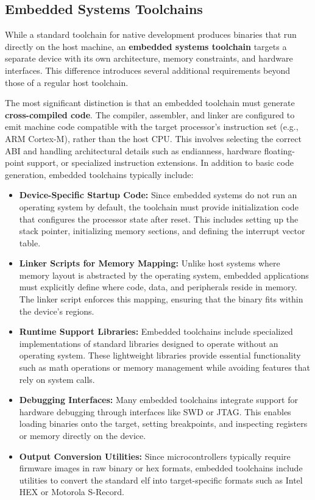 \subsection{Embedded Systems Toolchains}
While a standard toolchain for native development produces binaries that run directly on the host machine, an \textbf{embedded systems toolchain} targets a separate device with its own architecture, memory constraints, and hardware interfaces. 
This difference introduces several additional requirements beyond those of a regular host toolchain.

The most significant distinction is that an embedded toolchain must generate \textbf{cross-compiled code}. 
The compiler, assembler, and linker are configured to emit machine code compatible with the target processor's instruction set (e.g., ARM Cortex-M), rather than the host CPU. 
This involves selecting the correct ABI and handling architectural details such as endianness, hardware floating-point support, or specialized instruction extensions.
In addition to basic code generation, embedded toolchains typically include:
\begin{itemize}
	\item \textbf{Device-Specific Startup Code:} Since embedded systems do not run an operating system by default, the toolchain must provide initialization code that configures the processor state after reset. 
	This includes setting up the stack pointer, initializing memory sections, and defining the interrupt vector table.
	
	\item \textbf{Linker Scripts for Memory Mapping:} Unlike host systems where memory layout is abstracted by the operating system, embedded applications must explicitly define where code, data, and peripherals reside in memory. 
	The linker script enforces this mapping, ensuring that the binary fits within the device’s regions.
	
	\item \textbf{Runtime Support Libraries:} Embedded toolchains include specialized implementations of standard libraries designed to operate without an operating system. 
	These lightweight libraries provide essential functionality such as math operations or memory management while avoiding features that rely on system calls.
	
	\item \textbf{Debugging Interfaces:} Many embedded toolchains integrate support for hardware debugging through interfaces like SWD or JTAG. 
	This enables loading binaries onto the target, setting breakpoints, and inspecting registers or memory directly on the device.
	
	\item \textbf{Output Conversion Utilities:} Since microcontrollers typically require firmware images in raw binary or hex formats, embedded toolchains include utilities to convert the standard elf into target-specific formats such as Intel HEX or Motorola S-Record.
\end{itemize}

